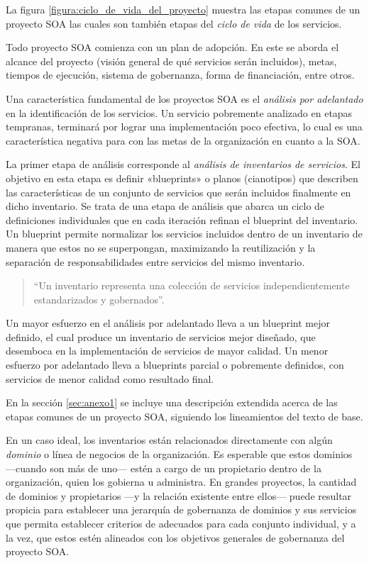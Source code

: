 \documentclass[11pt]{article}
\begin{document}
			La figura \ref{figura:ciclo_de_vida_del_proyecto} muestra las etapas comunes de un proyecto SOA las cuales son también etapas del \emph{ciclo de vida} de los servicios.

			Todo proyecto SOA comienza con un plan de adopción. En este se aborda el alcance del proyecto (visión general de qué servicios serán incluidos), metas, tiempos de ejecución, sistema de gobernanza, forma de financiación, entre otros.

			Una característica fundamental de los proyectos SOA es el \emph{análisis por adelantado} en la identificación de los servicios. Un servicio pobremente analizado en etapas tempranas, terminará por lograr una implementación poco efectiva, lo cual es una característica negativa para con las metas de la organización en cuanto a la SOA.

			La primer etapa de análisis corresponde al \emph{análisis de inventarios de servicios}. El objetivo en esta etapa es definir «blueprints» o planos (cianotipos) que describen las características de un conjunto de servicios que serán incluidos finalmente en dicho inventario. Se trata de una etapa de análisis que abarca un ciclo de definiciones individuales que en cada iteración refinan el blueprint del inventario. Un blueprint permite normalizar los servicios incluidos dentro de un inventario de manera que estos no se superpongan, maximizando la reutilización y la separación de responsabilidades entre servicios del mismo inventario. \cite{Erl:2011:SGG:1983453}

			\begin{quote}
				``Un inventario representa una colección de servicios independientemente estandarizados y gobernados''. \cite{Erl:2011:SGG:1983453}
			\end{quote}

			Un mayor esfuerzo en el análisis por adelantado lleva a un blueprint mejor definido, el cual produce un inventario de servicios mejor diseñado, que desemboca en la implementación de servicios de mayor calidad. Un menor esfuerzo por adelantado lleva a blueprints parcial o pobremente definidos, con servicios de menor calidad como resultado final.

			En la sección \ref{sec:anexo1} se incluye una descripción extendida acerca de las etapas comunes de un proyecto SOA, siguiendo los lineamientos del texto de base.

			En un caso ideal, los inventarios están relacionados directamente con algún \emph{dominio} o línea de negocios de la organización. Es esperable que estos dominios —cuando son más de uno— estén a cargo de un propietario dentro de la organización, quien los gobierna u administra. En grandes proyectos, la cantidad de dominios y propietarios —y la relación existente entre ellos— puede resultar propicia para establecer una jerarquía de gobernanza de dominios y sus servicios que permita establecer criterios de adecuados para cada conjunto individual, y a la vez, que estos estén alineados con los objetivos generales de gobernanza del proyecto SOA.
\end{document}
